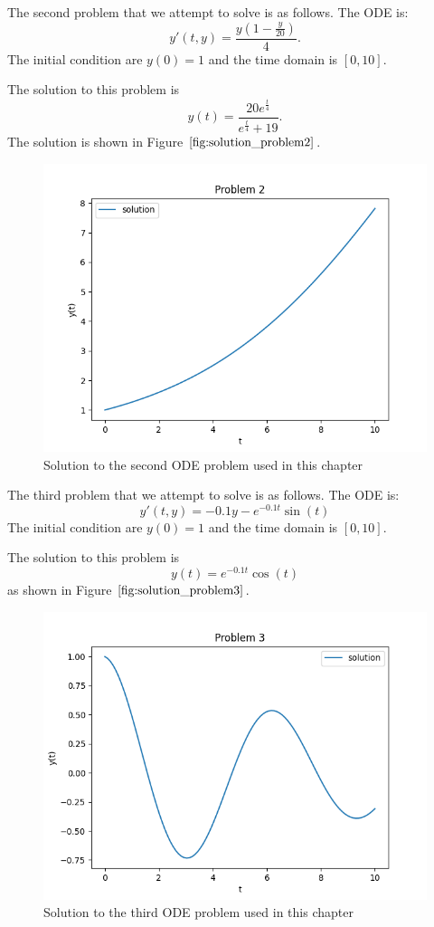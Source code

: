 \documentclass{article}
\begin{document}
The second problem that we attempt to solve is as follows.
The ODE is:
\begin{equation}
y'(t, y) = \frac{y(1 - \frac{y}{20})}{4}.
\end{equation}
The initial condition are $y(0) = 1$ and the time domain is $[0, 10]$.

The solution to this problem is
\begin{equation}
y(t) = \frac{20e^{\frac{t}{4}}}{e^{\frac{t}{4}} + 19}.
\end{equation}
The solution is shown in Figure $\ref{fig:solution_problem2}$.
\begin{figure}[H]
\centering
\includegraphics[width=0.7\linewidth]{./figures/solution_problem2}
\caption{Solution to the second ODE problem used in this chapter}
\label{fig:solution_problem2}
\end{figure}

The third problem that we attempt to solve is as follows.
The ODE is:
\begin{equation}
y'(t, y) = -0.1y - e^{-0.1t}\sin(t)
\end{equation}
The initial condition are $y(0) = 1$ and the time domain is $[0, 10]$.

The solution to this problem is 
\begin{equation}
y(t) = e^{-0.1t}\cos(t)
\end{equation}
as shown in Figure $\ref{fig:solution_problem3}$.

\begin{figure}[H]
\centering
\includegraphics[width=0.7\linewidth]{./figures/solution_problem3}
\caption{Solution to the third ODE problem used in this chapter}
\label{fig:solution_problem3}
\end{figure}
\end{document}

